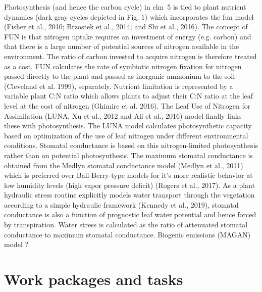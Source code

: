\documentclass[11pt, a4paper, oneside, article]{memoir}
\newcommand{\pcite}[1]{\parencite{#1}}
\begin{document}
Photosynthesis (and hence the carbon cycle) in \gls{clm}~5 is tied to plant nutrient dynamics (dark gray cycles depicted in Fig. 1) which incorporates the \gls{fun} model (Fisher et al., 2010; Brzostek et al., 2014; and Shi et al., 2016). The concept of FUN is that nitrogen uptake requires an investment of energy (e.g. carbon) and that there is a large number of potential sources of nitrogen available in the environment. The ratio of carbon invested to acquire nitrogen is therefore treated as a cost. FUN calculates the rate of symbiotic nitrogen fixation for nitrogen passed directly to the plant and passed as inorganic ammonium to the soil (Cleveland et al. 1999), separately. Nutrient limitation is represented by a variable plant C:N ratio which allows plants to adjust their C:N ratio at the leaf level at the cost of nitrogen (Ghimire et al. 2016). The Leaf Use of Nitrogen for Assimilation (LUNA, Xu et al., 2012 and Ali et al., 2016) model finally links these with photosynthesis. The LUNA model calculates photosynthetic capacity based on optimization of the use of leaf nitrogen under different environmental conditions. Stomatal conductance is based on this nitrogen-limited photosynthesis rather than on potential photosynthesis. The maximum stomatal conductance is obtained from the Medlyn stomatal conductance model (Medlyn et al., 2011) which is preferred over Ball-Berry-type models for it’s more realistic behavior at low humidity levels (high vapor pressure deficit) (Rogers et al., 2017).  
As a plant hydraulic stress routine explicitly models water transport through the vegetation according to a simple hydraulic framework (Kennedy et al., 2019), stomatal conductance is also a function of prognostic leaf water potential and hence forced by transpiration. Water stress is calculated as the ratio of attenuated stomatal conductance to maximum stomatal conductance.
Biogenic emissions (MAGAN) model \pcite{ACP:Guenther2006}?

\chapter{Work packages and tasks}

\printglossaries

\newpage

\printbibliography[env=bibliography]
\end{document}
